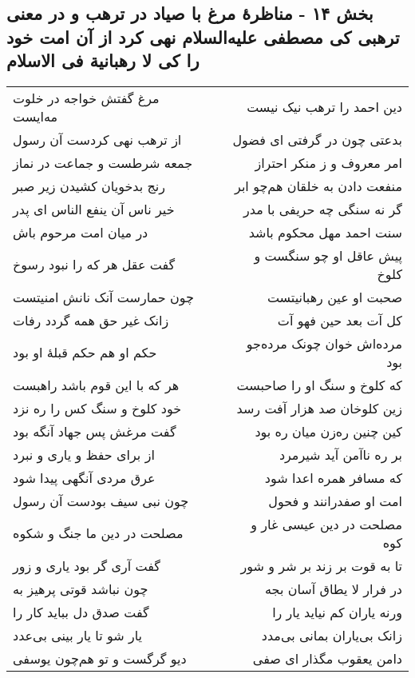 \begin{center}
\section*{بخش ۱۴ - مناظرهٔ مرغ با صیاد در ترهب و در معنی ترهبی کی مصطفی علیه‌السلام نهی کرد از آن امت خود را کی لا رهبانیة فی الاسلام}
\label{sec:sh014}
\begin{longtable}{l p{0.5cm} r}
مرغ گفتش خواجه در خلوت مه‌ایست
&&
دین احمد را ترهب نیک نیست
\\
از ترهب نهی کردست آن رسول
&&
بدعتی چون در گرفتی ای فضول
\\
جمعه شرطست و جماعت در نماز
&&
امر معروف و ز منکر احتراز
\\
رنج بدخویان کشیدن زیر صبر
&&
منفعت دادن به خلقان هم‌چو ابر
\\
خیر ناس آن ینفع الناس ای پدر
&&
گر نه سنگی چه حریفی با مدر
\\
در میان امت مرحوم باش
&&
سنت احمد مهل محکوم باشد
\\
گفت عقل هر که را نبود رسوخ
&&
پیش عاقل او چو سنگست و کلوخ
\\
چون حمارست آنک نانش امنیتست
&&
صحبت او عین رهبانیتست
\\
زانک غیر حق همه گردد رفات
&&
کل آت بعد حین فهو آت
\\
حکم او هم حکم قبلهٔ او بود
&&
مرده‌اش خوان چونک مرده‌جو بود
\\
هر که با این قوم باشد راهبست
&&
که کلوخ و سنگ او را صاحبست
\\
خود کلوخ و سنگ کس را ره نزد
&&
زین کلوخان صد هزار آفت رسد
\\
گفت مرغش پس جهاد آنگه بود
&&
کین چنین ره‌زن میان ره بود
\\
از برای حفظ و یاری و نبرد
&&
بر ره ناآمن آید شیرمرد
\\
عرق مردی آنگهی پیدا شود
&&
که مسافر همره اعدا شود
\\
چون نبی سیف بودست آن رسول
&&
امت او صفدرانند و فحول
\\
مصلحت در دین ما جنگ و شکوه
&&
مصلحت در دین عیسی غار و کوه
\\
گفت آری گر بود یاری و زور
&&
تا به قوت بر زند بر شر و شور
\\
چون نباشد قوتی پرهیز به
&&
در فرار لا یطاق آسان بجه
\\
گفت صدق دل بباید کار را
&&
ورنه یاران کم نیاید یار را
\\
یار شو تا یار بینی بی‌عدد
&&
زانک بی‌یاران بمانی بی‌مدد
\\
دیو گرگست و تو هم‌چون یوسفی
&&
دامن یعقوب مگذار ای صفی

\end{longtable}
\end{center}
